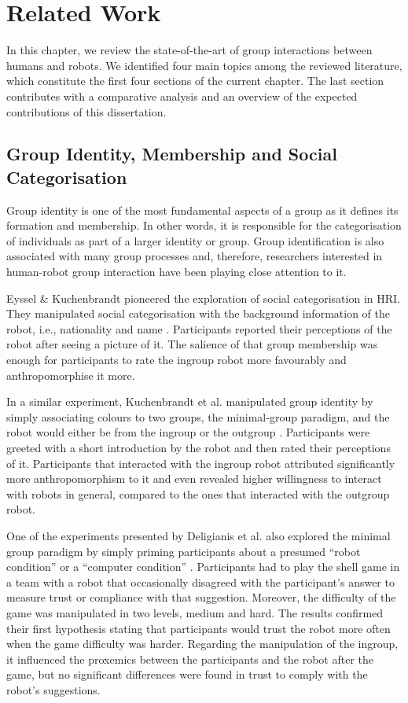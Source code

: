 \chapter{Related Work}
\label{chapter:related-work}

In this chapter, we review the state-of-the-art of group interactions between humans and robots. We identified four main topics among the reviewed literature, which constitute the first four sections of the current chapter. The last section contributes with a comparative analysis and an overview of the expected contributions of this dissertation.



\section{Group Identity, Membership and Social Categorisation}
\label{sec:identity}
Group identity is one of the most fundamental aspects of a group as it defines its formation and membership. In other words, it is responsible for the categorisation of individuals as part of a larger identity or group. Group identification is also associated with many group processes and, therefore, researchers interested in human-robot group interaction have been playing close attention to it.

Eyssel \& Kuchenbrandt pioneered the exploration of social categorisation in HRI. They manipulated social categorisation with the background information of the robot, i.e., nationality and name \cite{eyssel2012social}. Participants reported their perceptions of the robot after seeing a picture of it. The salience of that group membership was enough for participants to rate the ingroup robot more favourably and anthropomorphise it more.

In a similar experiment, Kuchenbrandt et al. manipulated group identity by simply associating colours to two groups, the minimal-group paradigm, and the robot would either be from the ingroup or the outgroup \cite{kuchenbrandt2013robot}. Participants were greeted with a short introduction by the robot and then rated their perceptions of it. Participants that interacted with the ingroup robot attributed significantly more anthropomorphism to it and even revealed higher willingness to interact with robots in general, compared to the ones that interacted with the outgroup robot.

One of the experiments presented by Deligianis et al. also explored the minimal group paradigm by simply priming participants about a presumed ``robot condition'' or a ``computer condition'' \cite{deligianis2017impact}. Participants had to play the shell game in a team with a robot that occasionally disagreed with the participant's answer to measure trust or compliance with that suggestion. Moreover, the difficulty of the game was manipulated in two levels, medium and hard. The results confirmed their first hypothesis stating that participants would trust the robot more often when the game difficulty was harder. Regarding the manipulation of the ingroup, it influenced the proxemics between the participants and the robot after the game, but no significant differences were found in trust to comply with the robot's suggestions.

